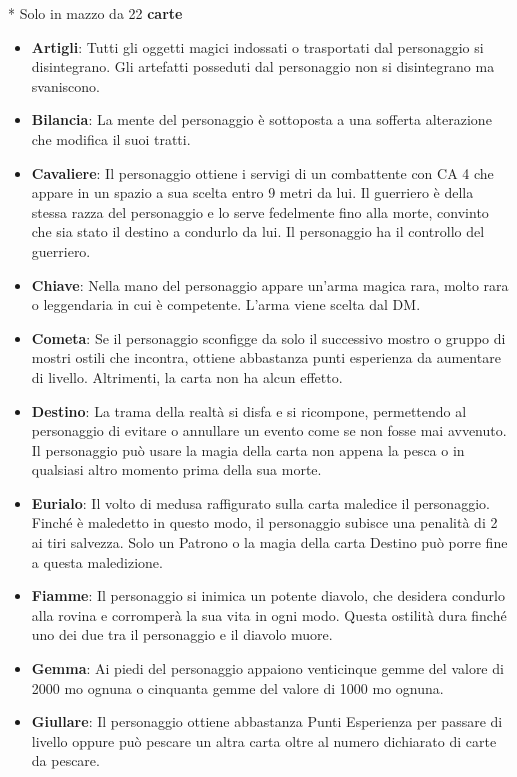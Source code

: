 \begin{multicols}{2}
\medskip

* Solo in mazzo da 22 \textbf{carte}


\noindent\begin{itemize}[leftmargin=*] \setlength{\itemsep}{0pt}
\item \textbf{Artigli}: Tutti gli oggetti magici indossati o trasportati dal personaggio si disintegrano. Gli artefatti posseduti dal personaggio non si disintegrano ma svaniscono.
\item \textbf{Bilancia}: La mente del personaggio è sottoposta a una sofferta alterazione che modifica il suoi tratti.
\item \textbf{Cavaliere}: Il personaggio ottiene i servigi di un combattente con CA 4 che appare in un spazio a sua scelta entro 9 metri da lui. Il guerriero è della stessa razza del personaggio e lo serve fedelmente fino alla morte, convinto che sia stato il destino a condurlo da lui. Il personaggio ha il controllo del guerriero.
\item \textbf{Chiave}: Nella mano del personaggio appare un’arma magica rara, molto rara o leggendaria in cui è competente. L’arma viene scelta dal DM.
\item \textbf{Cometa}: Se il personaggio sconfigge da solo il successivo mostro o gruppo di mostri ostili che incontra, ottiene abbastanza punti esperienza da aumentare di livello. Altrimenti, la carta non ha alcun effetto.
\item \textbf{Destino}: La trama della realtà si disfa e si ricompone, permettendo al personaggio di evitare o annullare un evento come se non fosse mai avvenuto. Il personaggio può usare la magia della carta non appena la pesca o in qualsiasi altro momento prima della sua morte.
\item \textbf{Eurialo}: Il volto di medusa raffigurato sulla carta maledice il personaggio. Finché è maledetto in questo modo, il personaggio subisce una penalità di 2 ai tiri salvezza. Solo un Patrono o la magia della carta Destino può porre fine a questa maledizione.
\item \textbf{Fiamme}: Il personaggio si inimica un potente diavolo, che desidera condurlo alla rovina e corromperà la sua vita in ogni modo. Questa ostilità dura finché uno dei due tra il personaggio e il diavolo muore.
\item \textbf{Gemma}: Ai piedi del personaggio appaiono venticinque gemme del valore di 2000 mo ognuna o cinquanta gemme del valore di 1000 mo ognuna.
\item \textbf{Giullare}: Il personaggio ottiene abbastanza Punti Esperienza per passare di livello oppure può pescare un altra carta oltre al numero dichiarato di carte da pescare.

\end{itemize}
\end{multicols}
